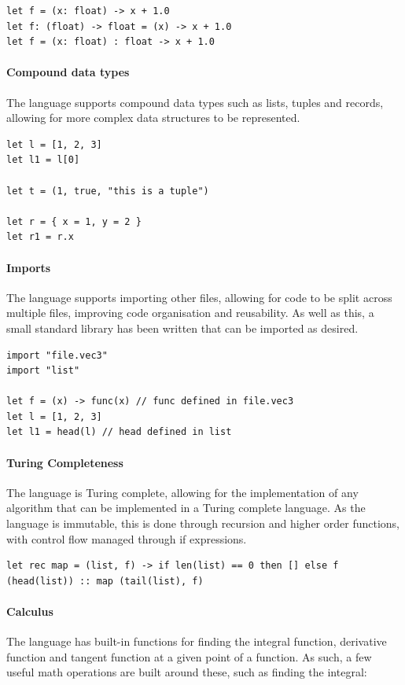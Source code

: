 \begin{verbatim}
let f = (x: float) -> x + 1.0
let f: (float) -> float = (x) -> x + 1.0
let f = (x: float) : float -> x + 1.0
\end{verbatim}

\paragraph{Compound data types} The language supports compound data types such as lists, tuples and records,
allowing for more complex data structures to be represented.

\begin{verbatim}
let l = [1, 2, 3]
let l1 = l[0]

let t = (1, true, "this is a tuple")

let r = { x = 1, y = 2 }
let r1 = r.x
\end{verbatim}

\paragraph{Imports} The language supports importing other files, allowing for code to be split across multiple
files, improving code organisation and reusability.
As well as this, a small standard library has been written that can be imported as desired.

\begin{verbatim}
import "file.vec3"
import "list"

let f = (x) -> func(x) // func defined in file.vec3
let l = [1, 2, 3]
let l1 = head(l) // head defined in list
\end{verbatim}

\paragraph{Turing Completeness} The language is Turing complete, allowing for the implementation of any
algorithm that can be implemented in a Turing complete language.
As the language is immutable, this is done through recursion and higher order functions, with control flow
managed through if expressions.

\begin{verbatim}
let rec map = (list, f) -> if len(list) == 0 then [] else f (head(list)) :: map (tail(list), f)
\end{verbatim}

\paragraph{Calculus} The language has built-in functions for finding the integral function, derivative function
and tangent function at a given point of a function.
As such, a few useful math operations are built around these, such as finding the integral:

